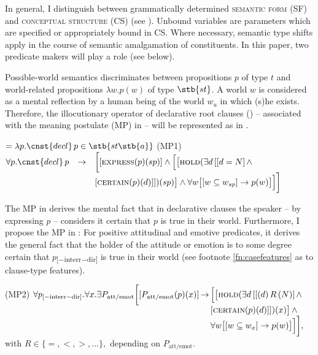 \documentclass[output=paper]{langscibook}
\begin{document}
In general, I distinguish between grammatically determined \textsc{semantic form} (SF) and \textsc{conceptual structure} (CS) (see \citealt{BierwischLang1987,Bierwisch2007,LangMaienborn2011}). Unbound variables are parameters which are specified or appropriately bound in CS. Where necessary, semantic type shifts apply in the course of semantic amalgamation of constituents. In this paper, two predicate makers will play a role (see below).

Possible-world semantics discriminates between propositions $p$ of type $t$ and world-related propositions $\lambda w. p(w)$ of type $\stb{st}$. A world $w$ is considered as a mental reflection by a human being of the world $w_u$ in which (s)he exists. Therefore, the illocutionary operator of declarative root clauses () -- associated with the meaning postulate (MP) in  -- will be represented as in .

\ea\label{ex:zimmermann:12}  $= \lambda p . \cnst{decl} \, p \in \stb{st\stb{a}}$
\ex\label{ex:zimmermann:13} (MP1)\\
$\begin{array}[t]{@{}lcl@{}}
\forall p . \cnst{decl} \, p & \rightarrow & \bigg[[\textsc{express} (p) (sp)] \wedge \Big[\big[\textsc{hold} (\exists d \, [[d = N] \, \wedge \\
                             &             & [\textsc{certain} (p) (d)]]) (sp)\big] \wedge \forall w \big[[w \subseteq w_{sp}] \rightarrow p(w)\big]\Big]\bigg]
\end{array}$
\z

\noindent The MP in  derives the mental fact that in declarative clauses the speaker -- by expressing $p$ -- considers it certain that $p$ is true in their world. Furthermore, I propose the MP in : For positive attitudinal and emotive predicates, it derives the general fact that the holder of the attitude or emotion is to some degree certain that $p$\textsubscript{[$-$interr$-$dir]} is true in their world (see footnote \ref{fn:casefeatures} as to clause-type features).

\ea\label{ex:zimmermann:14} (MP2)
$\begin{array}[t]{@{}l@{\,}c@{\,}l@{}}\forall p_\textrm{[$-$interr$-$dir]} . \forall x . \exists P_\textrm{att/emot} \bigg[ [P_\textrm{att/emot} (p)(x)] & \rightarrow & \Big[\big[\textsc{hold} (\exists d \, [[(d) \, R \, (N)] \, \wedge \\ & & [\textsc{certain} (p) (d)]]) (x)\big] \, \wedge \\ & & \forall w \big[[w \subseteq w_x] \rightarrow p(w)\big]\Big]\bigg],\end{array}$\\with $R \in \{=,<,>,{\dots}\},$ depending on $P_\textrm{att/emot}$.
\z
\end{document}
